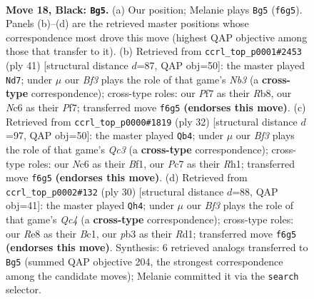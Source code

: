 \documentclass[11pt]{article}
\begin{document}
\clearpage

\begin{figure}[p]\centering
\begin{subfigure}{0.46\textwidth}\centering
\resizebox{\linewidth}{!}{%
\newchessgame
\chessboard[
  setfen={r1b1r3/1pp2pkp/2nq1b2/p2p4/3P2P1/NP2P3/P4P2/RNBQRK2 b - - 0 18},
  showmover=false,
  pgfstyle=straightmove, color=movearrow, markmove={f6-g5}
]}
\caption{}
\end{subfigure}\hfill
\begin{subfigure}{0.46\textwidth}\centering
\resizebox{\linewidth}{!}{%
\newchessgame
\chessboard[
  setfen={1rb1r1k1/5p2/pn1p1q1p/2pP2p1/4P3/1P4P1/3N1PBP/R2QR1K1 b - - 0 21},
  showmover=false,
  pgfstyle=straightmove, color=movearrow, markmove={b6-d7}
]}
\caption{}
\end{subfigure}
\\[4pt]
\begin{subfigure}{0.46\textwidth}\centering
\resizebox{\linewidth}{!}{%
\newchessgame
\chessboard[
  setfen={r1b2rk1/p2n1pp1/q3pn1p/1p6/2pNP3/P1Q2P2/1P3BPP/3RKB1R w K - 0 17},
  showmover=false,
  pgfstyle=straightmove, color=movearrow, markmove={c3-b4}
]}
\caption{}
\end{subfigure}\hfill
\begin{subfigure}{0.46\textwidth}\centering
\resizebox{\linewidth}{!}{%
\newchessgame
\chessboard[
  setfen={rnb2rk1/1p3ppp/p4n2/4pq2/2Q5/PNP2B2/P4PPP/R1BR2K1 w - - 2 16},
  showmover=false,
  pgfstyle=straightmove, color=movearrow, markmove={c4-h4}
]}
\caption{}
\end{subfigure}
\caption{\textbf{Move 18, Black: \texttt{Bg5}.} (a) Our position; Melanie plays \texttt{Bg5} (\texttt{f6g5}). Panels (b)--(d) are the retrieved master positions whose correspondence most drove this move (highest QAP objective among those that transfer to it). (b) Retrieved from \texttt{ccrl\_top\_p0001\#2453} (ply 41) [structural distance $d$=87, QAP obj=50]: the master played \texttt{Nd7}; under $\mu$ our \emph{Bf3} plays the role of that game's \emph{Nb3} (a \textbf{cross-type} correspondence); cross-type roles: our \emph{P}f7 as their \emph{R}b8, our \emph{N}c6 as their \emph{P}f7; transferred move \texttt{f6g5} \textbf{(endorses this move)}. (c) Retrieved from \texttt{ccrl\_top\_p0000\#1819} (ply 32) [structural distance $d$=97, QAP obj=50]: the master played \texttt{Qb4}; under $\mu$ our \emph{Bf3} plays the role of that game's \emph{Qc3} (a \textbf{cross-type} correspondence); cross-type roles: our \emph{N}c6 as their \emph{B}f1, our \emph{P}c7 as their \emph{R}h1; transferred move \texttt{f6g5} \textbf{(endorses this move)}. (d) Retrieved from \texttt{ccrl\_top\_p0002\#132} (ply 30) [structural distance $d$=88, QAP obj=41]: the master played \texttt{Qh4}; under $\mu$ our \emph{Bf3} plays the role of that game's \emph{Qc4} (a \textbf{cross-type} correspondence); cross-type roles: our \emph{R}e8 as their \emph{B}c1, our \emph{p}b3 as their \emph{R}d1; transferred move \texttt{f6g5} \textbf{(endorses this move)}. Synthesis: 6 retrieved analogs transferred to \texttt{Bg5} (summed QAP objective 204, the strongest correspondence among the candidate moves); Melanie committed it via the \texttt{search} selector.}
\label{fig:thought-m35}
\end{figure}
\end{document}
